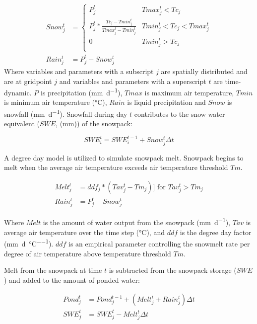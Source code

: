 \begin{align}
Snow_j^t &= \left\{
        \begin{array}{ll}
        P_j^t &  Tmax_j^t < Tc_j \\  
        P_j^t * \frac{Tc_j - Tmin_j^t}{Tmax_j^t - Tmin_j^t} & Tmin_j^t < Tc_j < Tmax_j^t \\
        0 &  Tmin_j^t > Tc_j \\
        \end{array}
\right.\\
Rain_j^t &= P_j^t - Snow_j^t     
\end{align}
\noindent Where variables and parameters with a subscript $j$ are spatially distributed and are at gridpoint $j$ and variables and parameters with a superscript $t$ are time-dynamic. $P$ is precipitation (\si{\milli\metre\per\day}), $Tmax$ is maximum air temperature, $Tmin$ is minimum air temperature (\si{\degreeCelsius}), $Rain$ is liquid precipitation and $Snow$ is snowfall (\si{\milli\metre\per\day}). Snowfall during day $t$ contributes to the snow water equivalent ($SWE$, (\si{\milli\metre})) of the snowpack:

\begin{equation}
SWE_i^t = SWE_i^{t-1} + Snow_j^t \Delta t
\end{equation}

A degree day model is utilized to simulate snowpack melt. Snowpack begins to melt when the average air temperature exceeds air temperature threshold $Tm$.

\begin{align}
Melt_j^t &= ddf_j * (Tav_j^t - Tm_j)  ]\text{ for } Tav_j^t > Tm_j \\
Rain_j^t &= P_j^t - Snow_j^t     
\end{align}

\noindent Where $Melt$ is the amount of water output from the snowpack (\si{\milli\metre\per\day}), $Tav$ is average air temperature over the time step (\si{\degreeCelsius}), and $ddf$ is the degree day factor (\si{\milli\metre\per\day\per\degreeCelsius}). $ddf$ is an empirical parameter controlling the snowmelt rate per degree of air temperature above temperature threshold $Tm$. 

Melt from the snowpack at time $t$ is subtracted from the snowpack storage ($SWE$) and added to the amount of ponded water:

\begin{align}
Pond_j^t &= Pond_j^{t-1} + (Melt_j^t + Rain_j^t)\Delta t \\
SWE_j^t &= SWE_j^t - Melt_j^t \Delta t   
\end{align}


